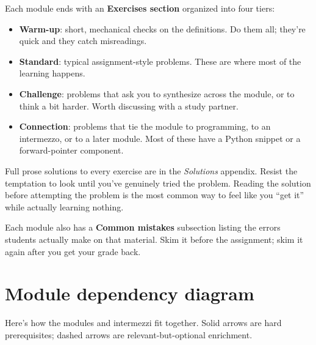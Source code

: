 \documentclass[11pt]{article}
\begin{document}
Each module ends with an \textbf{Exercises section} organized into four tiers:
\begin{itemize}
  \item \textbf{Warm-up}: short, mechanical checks on the definitions. Do them all; they're quick and they catch misreadings.
  \item \textbf{Standard}: typical assignment-style problems. These are where most of the learning happens.
  \item \textbf{Challenge}: problems that ask you to synthesize across the module, or to think a bit harder. Worth discussing with a study partner.
  \item \textbf{Connection}: problems that tie the module to programming, to an intermezzo, or to a later module. Most of these have a Python snippet or a forward-pointer component.
\end{itemize}

Full prose solutions to every exercise are in the \emph{Solutions} appendix. Resist the temptation to look until you've genuinely tried the problem. Reading the solution before attempting the problem is the most common way to feel like you ``get it'' while actually learning nothing.

Each module also has a \textbf{Common mistakes} subsection listing the errors students actually make on that material. Skim it before the assignment; skim it again after you get your grade back.

\section*{Module dependency diagram}

Here's how the modules and intermezzi fit together. Solid arrows are hard prerequisites; dashed arrows are relevant-but-optional enrichment.
\end{document}
